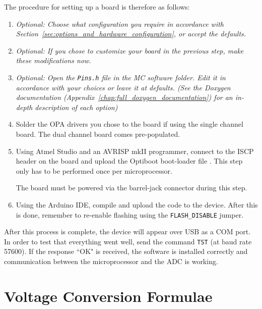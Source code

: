 \documentclass[11pt]{report}
\newcommand{\baudrate}{57600}
\begin{document}
The procedure for setting up a board is therefore as follows:

\begin{enumerate}
	\item \textit{Optional: Choose what configuration you require in accordance with Section~\ref{sec:options_and_hardware_configuration}, or accept the defaults.}
	\item \textit{Optional: If you chose to customize your board in the previous step, make these modifications now. }
	\item \textit{Optional: Open the {\tt Pins.h} file in the MC software folder. Edit it in accordance with your choices or leave it at defaults. (See the Doxygen documentation (Appendix~\ref{chap:full_doxygen_documentation}) for an in-depth description of each option)}

	\item Solder the OPA drivers you chose to the board if using the single channel board. The dual channel board comes pre-populated. 

	\item Using Atmel Studio and an AVRISP mkII programmer, connect to the ISCP header on the board and upload the Optiboot boot-loader file . This step only has to be performed once per microprocessor. 

	The board must be powered via the barrel-jack connector during this step. 
	\item Using the Arduino IDE, compile and upload the code to the device. After this is done, remember to re-enable flashing using the {\tt FLASH\_DISABLE} jumper. 
	
\end{enumerate}

After this process is complete, the device will appear over USB as a COM port. In order to test that everything went well, send the command {\tt *TST} (at baud rate \baudrate). If the response ``OK" is received, the software is installed correctly and communication between the microprocessor and the ADC is working. 



\chapter{Voltage Conversion Formulae} %
\label{sec:voltage_conversion_formulae}
\end{document}
